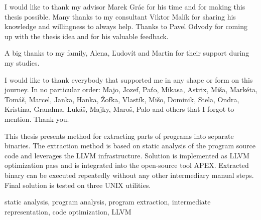 \documentclass[12pt, twoside]{fithesis2}
\renewcommand{\_}{\leavevmode \kern0.07em\vbox{\hrule width0.4em}}
\begin{document}
\FrontMatter
\ThesisTitlePage






\begin{ThesisDeclaration}
    \DeclarationText
    \AdvisorName
\end{ThesisDeclaration}

\begin{ThesisThanks}
I would like to thank my advisor Marek Grác for his time and for making this
thesis possible.
Many thanks to my consultant Viktor Malík for sharing his knowledge and
willingness to always help.
Thanks to Pavel Odvody for coming up with the thesis idea and for his
valuable feedback.

A big thanks to my family, Alena, Ľudovít and Martin for their support
during my studies.

I would like to thank everybody that supported me in any shape or form on this
journey. In no particular order: Majo, Jozef, Paťo, Mikasa, Astrix,
Miša, Markéta, Tomáš, Marcel, Janka, Hanka, Žofka, Vlastík, Mišo, Dominik,
Stela, Ondra, Kristína, Grandma, Lukáš, Majky, Maroš, Palo and others that I
forgot to mention. Thank you.
\end{ThesisThanks}

\begin{ThesisAbstract}
This thesis presents method for extracting parts of programs into separate
binaries.
The extraction method is based on static analysis of the program source code
and leverages the LLVM infrastructure.
Solution is implemented as LLVM optimization pass and is integrated into the
open-source tool APEX.
Extracted binary can be executed repeatedly without any other intermediary
manual steps.
Final solution is tested on three UNIX utilities.

\end{ThesisAbstract}

\begin{ThesisKeyWords}
static analysis, program analysis, program extraction, intermediate
representation, code optimization, LLVM
\end{ThesisKeyWords}
\end{document}
